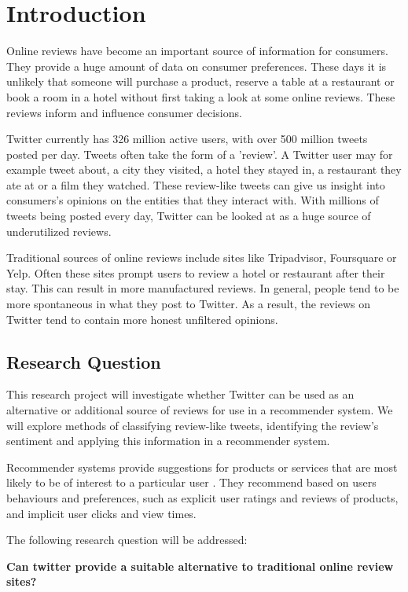 \chapter{Introduction}
Online reviews have become an important source of information for consumers. They provide a huge amount of data on consumer preferences. These days it is unlikely that someone will purchase a product, reserve a table at a restaurant or book a room in a hotel without first taking a look at some online reviews. These reviews inform and influence consumer decisions.

Twitter currently has 326 million active users, with over 500 million tweets posted per day. Tweets often take the form of a 'review'. A Twitter user may for example tweet about, a city they visited, a hotel they stayed in, a restaurant they ate at or a film they watched. These review-like tweets can give us insight into consumers’s opinions on the entities that they interact with. With millions of tweets being posted every day, Twitter can be looked at as a huge source of underutilized reviews.

Traditional sources of online reviews include sites like Tripadvisor, Foursquare or Yelp. Often these sites prompt users to review a hotel or restaurant after their stay. This can result in more manufactured reviews. In general, people tend to be more spontaneous in what they post to Twitter. As a result, the reviews on Twitter tend to contain more honest unfiltered opinions. 

\section{Research Question}
This research project will investigate whether Twitter can be used as an alternative or additional source of reviews for use in a recommender system. We will explore methods of classifying review-like tweets, identifying the review's sentiment and applying this information in a recommender system.

Recommender systems provide suggestions for products or services that are most likely to be of interest to a particular user \cite{Ricci2015}. They recommend based on users behaviours and preferences, such as explicit user ratings and reviews of products, and implicit user clicks and view times.

The following research question will be addressed:

\textbf{Can twitter provide a suitable alternative to traditional online review sites?}\\

